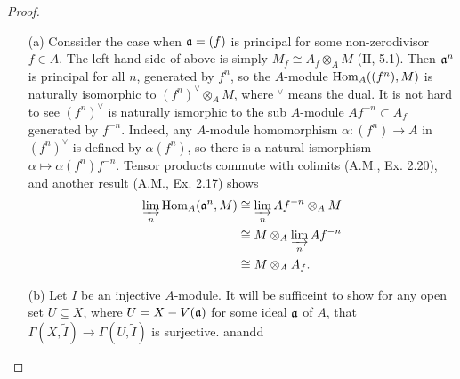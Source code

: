 \documentclass{article}
\begin{document}
\begin{enumerate} [label=\textbf{\arabic*.}, leftmargin=0em]
\begin{proof} $ $ \vspace{0pt}
\begin{itemize} [leftmargin=0cm]
\item[(a)] Conssider the case when $\mathfrak{a} = (f)$ is principal for some non-zerodivisor $f \in A$.
The left-hand side of above is simply $M_f \cong A_f \otimes_A M$ (II, 5.1).
Then $\mathfrak{a}^n$ is principal for all $n$, generated by $f^n$, so the $A$-module $\operatorname{Hom}_A((f^n), M)$ is naturally isomorphic to $(f^n)^\vee \otimes_A M$, where ${}^\vee$ means the dual.
It is not hard to see $(f^n)^\vee$ is naturally ismorphic to the sub $A$-module $Af^{-n} \subset A_f$ generated by $f^{-n}$.
Indeed, any $A$-module homomorphism $\alpha : (f^n) \to A$ in $(f^n)^\vee$ is defined by $\alpha(f^n)$, so there is a natural ismorphism $\alpha \mapsto \alpha(f^{n})f^{-n}$.
Tensor products commute with colimits (A.M., Ex. 2.20), and another result (A.M., Ex. 2.17) shows
\begin{align*}
  \varinjlim_n \operatorname{Hom}_A(\mathfrak{a}^n, M) & \cong \varinjlim_n Af^{-n} \otimes_A M \\
  & \cong M \otimes_A \varinjlim_n Af^{-n} \\
  & \cong M \otimes_A A_f.
\end{align*}

\item[(b)] Let $I$ be an injective $A$-module.
It will be sufficeint to show for any open set $U \subseteq X$, where $U = X - V(\mathfrak{a})$ for some ideal $\mathfrak{a}$ of $A$, that $\Gamma(X, \tilde{I}) \to \Gamma(U, \tilde{I})$ is surjective.
anandd
\end{itemize} 
\end{proof}

\end{enumerate}
\end{document}
